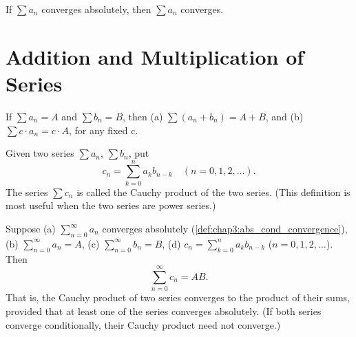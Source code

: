 \begin{theorem} %
  \label{thm:chap3:abs_conv_implies_conv}
  If $\sum a_n$ converges absolutely, then $\sum a_n$ converges.
\end{theorem}

\section{Addition and Multiplication of Series}
\label{sec:chap3:series_ops}

\begin{theorem} %
  \label{thm:chap3:series_algebra}
  If $\sum a_n = A$ and $\sum b_n = B$, then
  (a) $\sum (a_n + b_n) = A + B$, and
  (b) $\sum c \cdot a_n = c \cdot A$, for any fixed c.
\end{theorem}



\begin{definition} %
  \label{def:chap3:cauchy_product}
  Given two series $\sum a_n$, $\sum b_n$, put
  \[ c_n = \sum_{k=0}^n a_k b_{n-k} \quad (n = 0, 1, 2, \dots). \]
  The series $\sum c_n$ is called the Cauchy product of the two series.
  (This definition is most useful when the two series are power series.)
\end{definition}

\begin{theorem} %
  \label{thm:chap3:mertens_cauchy_product}
  Suppose
  (a) $\sum_{n=0}^\infty a_n$ converges absolutely
  (\autoref{def:chap3:abs_cond_convergence}),
  (b) $\sum_{n=0}^\infty a_n = A$,
  (c) $\sum_{n=0}^\infty b_n = B$,
  (d) $c_n = \sum_{k=0}^n a_k b_{n-k}$ ($n = 0, 1, 2, \dots$).
  Then
  \[ \sum_{n=0}^\infty c_n = AB. \]
  That is, the Cauchy product of two series converges to the product
  of their sums, provided that at least one of the series converges absolutely.
  (If both series converge conditionally, their Cauchy product need
  not converge.)
\end{theorem}

